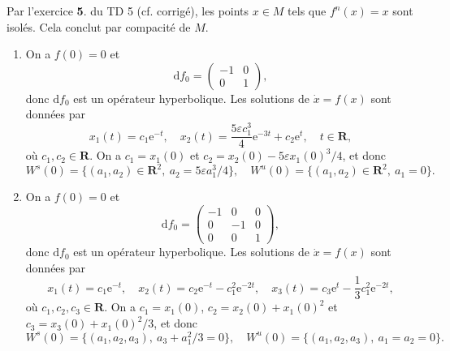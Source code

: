 \documentclass[a4paper,12pt,openany]{article}
\theoremstyle{plain}
\theoremstyle{definition}
\newcommand{\e}{\mathrm{e}}
\newcommand{\dd}{\mathrm{d}}
\newcommand{\R}{\mathbf{R}}
\begin{document}
\noindent Par l'exercice \textbf{5}. du TD 5 (cf. corrig\'e), les points $x \in M$ tels que $f^n(x) = x$ sont isol\'es. Cela conclut par compacit\'e de $M$.

\vspace{0.6cm}




 \vspace{1.5mm} 


\begin{enumerate}
\item On a $f(0) = 0$ et 
$$
\dd f_0 = \begin{pmatrix} -1 & 0 \\ 0 & 1 \end{pmatrix},
$$
donc $\dd f_0$ est un op\'erateur hyperbolique. Les solutions de $\dot x = f(x)$ sont donn\'ees par 
$$
x_1(t) = c_1 \e^{-t}, \quad x_2(t) = \frac{5\varepsilon c_1^3}{4}\e^{-3t} + c_2 \e^{t}, \quad t \in \R,
$$
o\`u $c_1, c_2 \in \R$. On a $c_1 = x_1(0)$ et $c_2 = x_2(0) - 5\varepsilon x_1(0)^3/4$, et donc
$$
W^s(0) = \{(a_1, a_2) \in \R^2,~a_2 = 5\varepsilon a_1^3 / 4\}, \quad W^u(0) = \{(a_1, a_2) \in \R^2,~a_1 = 0\}.
$$
\item On a $f(0) = 0$ et 
$$
\dd f_0 = \begin{pmatrix} -1 & 0 & 0 \\ 0 & -1 & 0 \\ 0 & 0 & 1 \end{pmatrix},
$$
donc $\dd f_0$ est un op\'erateur hyperbolique. Les solutions de $\dot x = f(x)$ sont donn\'ees par 
$$
x_1(t) = c_1 \e^{-t}, \quad x_2(t) = c_2 \e^{-t} - c_1^2 \e^{-2t}, \quad x_3(t) = c_3 \e^{t} - \frac{1}{3}c_1^2 \e^{-2t},
$$
o\`u $c_1, c_2, c_3 \in \R$. On a $c_1 = x_1(0)$, $c_2 = x_2(0) + x_1(0)^2$ et $c_3 = x_3(0) + x_1(0)^2/3$, et donc
$$
W^s(0) = \{(a_1, a_2, a_3),~a_3 + a_1^2 / 3 = 0\}, \quad W^u(0) = \{(a_1, a_2, a_3),~a_1 = a_2 = 0\}.
$$
\end{enumerate}


\vspace{0.6cm}

 \vspace{1.5mm} 
\end{document}
